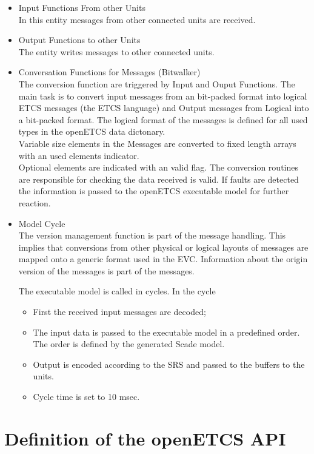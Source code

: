 \documentclass{template/openetcs_report}
\begin{document}
\begin{itemize}
\item Input Functions From other Units\\
In this entity messages from other connected units are received.
\item Output Functions to other Units\\
The entity writes messages to other connected units.
\item Conversation Functions for Messages (Bitwalker)\\
The conversion function are triggered by Input and Ouput Functions. The main task is to convert input messages from an bit-packed format into logical ETCS messages (the ETCS language) and Output messages from Logical into a bit-packed format. The logical format of the messages is defined for all used types in the openETCS data dictonary. \\
Variable size elements in the Messages are converted to fixed length arrays with an used elements indicator.\\
Optional elements are indicated with an valid flag.
The conversion routines are responsible for checking the data received is valid. If  faults are detected the information is passed to the openETCS executable model for further reaction. 
\item Model Cycle\\

The version management function is part of the message handling. This implies that conversions from other physical or logical layouts of messages are mapped onto a generic format used in the EVC. Information about the origin version of the messages is part of the messages.
 
The executable model is called in cycles. In the cycle 
\begin{itemize}
\item First the received input messages are decoded;
\item The input data is passed to the executable model in a predefined order. The order is defined by the generated Scade model.
\item Output is encoded according to the SRS and passed to the  buffers to the units.
\item Cycle time is set to 10 msec.
\end{itemize}
\end{itemize}


\chapter{Definition of the openETCS API}
\end{document}
